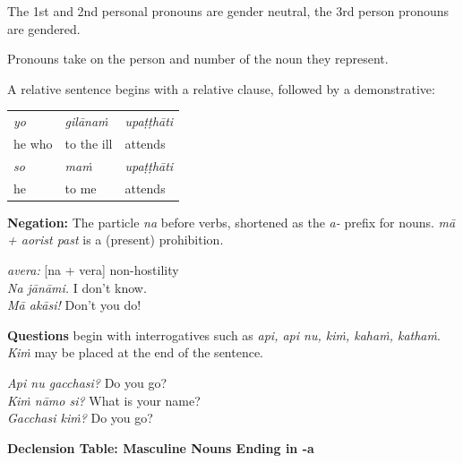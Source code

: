 \documentclass[11pt,oneside]{memoir}
\begin{document}
The 1st and 2nd personal pronouns are gender neutral, the 3rd person pronouns are gendered.

Pronouns take on the person and number of the noun they represent.

\clearpage

A relative sentence begins with a relative clause, followed by a demonstrative:

\begin{center}
\begin{tabular}{lll}
\emph{yo} & \emph{gilānaṁ} & \emph{upaṭṭhāti}\\
he who & to the ill & attends\\
\emph{so} & \emph{maṁ} & \emph{upaṭṭhāti}\\
he & to me & attends\\
\end{tabular}
\end{center}

\bigskip

\begin{multicols}{2}

\textbf{Negation:} The particle \emph{na} before verbs, shortened as the \emph{a-} prefix for
nouns. \emph{mā + aorist past} is a (present) prohibition.

\emph{avera:} {[}na + vera] non-hostility \\
\emph{Na jānāmi.} I don't know. \\
\emph{Mā akāsi!} Don't you do!

\columnbreak

\textbf{Questions} begin with interrogatives such as \emph{api, api nu, kiṁ, kahaṁ, kathaṁ}.
\emph{Kiṁ} may be placed at the end of the sentence.

\emph{Api nu gacchasi?} Do you go?\\
\emph{Kiṁ nāmo si?} What is your name?\\
\emph{Gacchasi kiṁ?} Do you go?

\end{multicols}

\textbf{Declension Table: Masculine Nouns Ending in -a}
\end{document}
